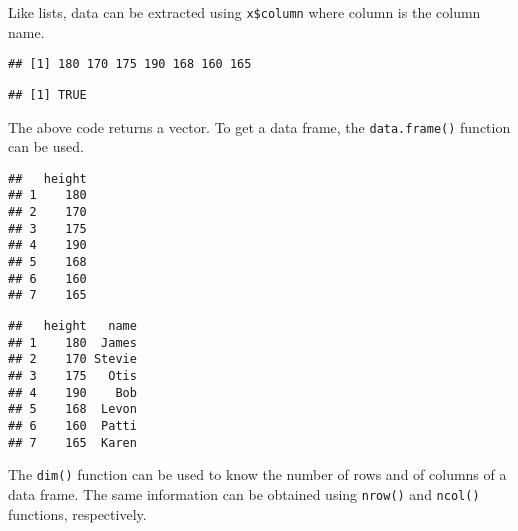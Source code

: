 \documentclass[]{book}
\newenvironment{Shaded}{\begin{snugshade}}{\end{snugshade}}
\newcommand{\KeywordTok}[1]{\textcolor[rgb]{0.13,0.29,0.53}{\textbf{{#1}}}}
\newcommand{\DataTypeTok}[1]{\textcolor[rgb]{0.13,0.29,0.53}{{#1}}}
\newcommand{\NormalTok}[1]{{#1}}
\begin{document}
Like lists, data can be extracted using \texttt{x\$column} where column
is the column name.

\begin{Shaded}
\end{Shaded}

\begin{verbatim}
## [1] 180 170 175 190 168 160 165
\end{verbatim}

\begin{Shaded}
\end{Shaded}

\begin{verbatim}
## [1] TRUE
\end{verbatim}

The above code returns a vector. To get a data frame, the
\texttt{data.frame()} function can be used.

\begin{Shaded}
\end{Shaded}

\begin{verbatim}
##   height
## 1    180
## 2    170
## 3    175
## 4    190
## 5    168
## 6    160
## 7    165
\end{verbatim}

\begin{Shaded}
\end{Shaded}

\begin{verbatim}
##   height   name
## 1    180  James
## 2    170 Stevie
## 3    175   Otis
## 4    190    Bob
## 5    168  Levon
## 6    160  Patti
## 7    165  Karen
\end{verbatim}

The \texttt{dim()} function can be used to know the number of rows and
of columns of a data frame. The same information can be obtained using
\texttt{nrow()} and \texttt{ncol()} functions, respectively.
\end{document}
